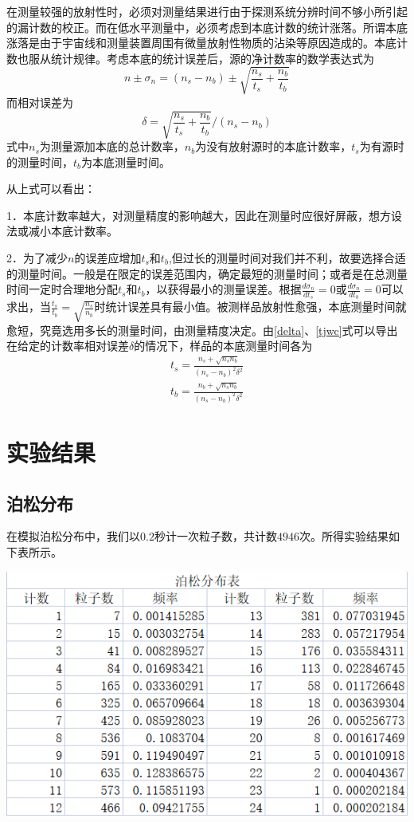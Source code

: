 \documentclass[hyperref]{ctexart}
\begin{document}
\begin{multicols}{2}
在测量较强的放射性时，必须对测量结果进行由于探测系统分辨时间不够小所引起的漏计数的校正。而在低水平测量中，必须考虑到本底计数的统计涨落。所谓本底涨落是由于宇宙线和测量装置周围有微量放射性物质的沾染等原因造成的。本底计数也服从统计规律。考虑本底的统计误差后，源的净计数率的数学表达式为\begin{equation}n\pm\sigma_n=(n_s-n_b)\pm\sqrt{\frac{n_s}{t_s}+\frac{n_b}{t_b}}\end{equation}
而相对误差为\begin{equation}\delta=\sqrt{\frac{n_s}{t_s}+\frac{n_b}{t_b}}/(n_s-n_b)\end{equation}式中$n_s$为测量源加本底的总计数率，$n_b$为没有放射源时的本底计数率，$t_s$为有源时的测量时间，$t_b$为本底测量时间。

从上式可以看出：

1．本底计数率越大，对测量精度的影响越大，因此在测量时应很好屏蔽，想方设法或减小本底计数率。

2．为了减少$n$的误差应增加$t_s$和$t_b$,但过长的测量时间对我们并不利，故要选择合适的测量时间。一般是在限定的误差范围内，确定最短的测量时间；或者是在总测量时间一定时合理地分配$t_s$和$t_b$，以获得最小的测量误差。根据$\frac{d\sigma_n}{dt_s}=0$或$\frac{d\sigma_n}{dt_b}=0$可以求出，当$\frac{t_s}{t_b}=\sqrt{\frac{n_s}{n_b}}$时统计误差具有最小值。被测样品放射性愈强，本底测量时间就愈短，究竟选用多长的测量时间，由测量精度决定。由\eqref{delta}、\eqref{tjwc}式可以导出在给定的计数率相对误差$\delta$的情况下，样品的本底测量时间各为\begin{equation}\begin{split}t_s=\frac{n_s+\sqrt{n_s n_b}}{(n_s-n_b)^2\delta^2} \\ t_b=\frac{n_b+\sqrt{n_s n_b}}{(n_s-n_b)^2\delta^2}\end{split} \label{tstb}\end{equation}
\section{实验结果}
\subsection{泊松分布}
在模拟泊松分布中，我们以$0.2$秒计一次粒子数，共计数$4946$次。所得实验结果如下表所示。

\begin{center} \includegraphics[scale=0.4]{bsbg.png} \label{bsbg} \end{center}


\end{multicols}
\end{document}
